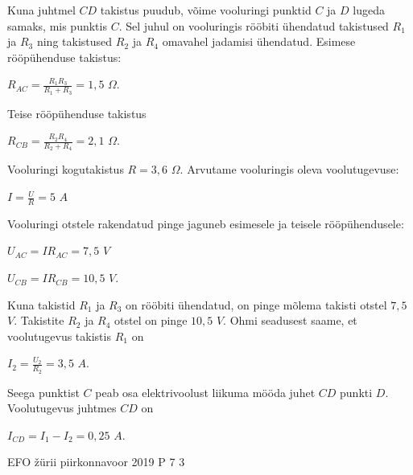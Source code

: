 \documentclass[11pt]{article}
\begin{document}
{{\ifSolution
Kuna juhtmel $CD$ takistus puudub, võime vooluringi punktid $C$ ja $D$ lugeda samaks, mis punktis $C$. Sel juhul on vooluringis rööbiti ühendatud takistused $R_1$ ja $R_3$ ning takistused $R_2$ ja $R_4$ omavahel jadamisi ühendatud. 
Esimese rööpühenduse takistus:
\begin{center}
$R_{AC} = \frac{R_1 R_3}{R_1 + R_3} = 1,5$ $\Omega$.
\end{center}
Teise rööpühenduse takistus
\begin{center}
$R_{CB} = \frac{R_2 R_4}{R_2 + R_4} = 2,1$ $\Omega$.
\end{center}
Vooluringi kogutakistus $R = 3,6$ $\Omega$.
Arvutame vooluringis oleva voolutugevuse:
\begin{center}
$I = \frac{U}{R} = 5$ $A$
\end{center}
Vooluringi otstele rakendatud pinge jaguneb esimesele ja teisele rööpühendusele:
\begin{center}
$U_{AC} = I R_{AC} = 7,5$ $V$
\end{center}
\begin{center}
$U_{CB} = I R_{CB} = 10,5$ $V$.
\end{center}

Kuna takistid $R_1$ ja $R_3$ on rööbiti ühendatud, on pinge mõlema takisti otstel $7,5$ $V$. Takistite $R_2$ ja $R_4$ otstel on pinge $10,5$ $V$.
Ohmi seadusest saame, et voolutugevus takistis $R_1$ on
\begin{center}
$I_2 = \frac{U_2}{R_2} = 3,5$ $A$.
\end{center}
Seega punktist $C$ peab osa elektrivoolust liikuma mööda juhet $CD$ punkti $D$. Voolutugevus juhtmes $CD$ on
\begin{center}
$I_{CD} = I_1 - I_2 = 0,25$ $A$.
\end{center}
\fi
}

{EFO žürii} %
{piirkonnavoor} %
{2019} %
{P 7} %
{3} %
{

}}
\end{document}
